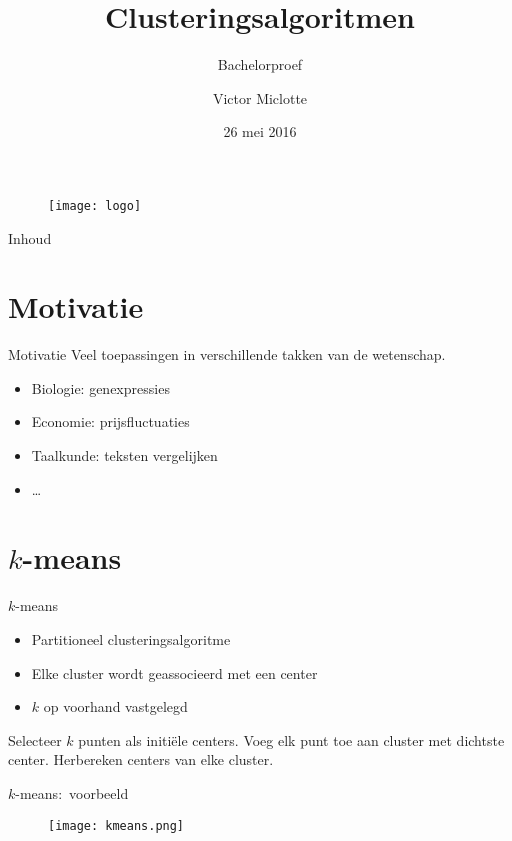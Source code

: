 \documentclass{beamer}
\title{Clusteringsalgoritmen}
\subtitle{Bachelorproef}
\author{Victor Miclotte}
\institute{Universiteit Gent}
\date{26 mei 2016}
\newcommand{\kmeans}{$k$-means}
\begin{document}
	\titlepage
	\begin{figure}
	\centering
	\texttt{[image: logo]} 
	\end{figure}

	
\begin{frame}{Inhoud}
	\tableofcontents
\end{frame}

\section{Motivatie}


\begin{frame}{Motivatie}
Veel toepassingen in verschillende takken van de wetenschap.
\begin{itemize}
 \item Biologie: genexpressies
 \item Economie: prijsfluctuaties
 \item Taalkunde: teksten vergelijken
 \item \ldots
\end{itemize}
\end{frame}


\section{\kmeans}


\begin{frame}{\kmeans}
\begin{itemize}
 \item Partitioneel clusteringsalgoritme
 \item Elke cluster wordt geassocieerd met een center
 \item $k$ op voorhand vastgelegd
\end{itemize}

\begin{algorithm}[H]
\begin{algorithmic}[1]
\STATE Selecteer $k$ punten als initiële centers.
\STATE Voeg elk punt toe aan cluster met dichtste center.
\STATE Herbereken centers van elke cluster.
\ENDWHILE
\end{algorithmic}
\caption{\kmeans}
\end{algorithm}
\end{frame}

\begin{frame}{\kmeans:\ voorbeeld}
 \begin{figure}[!ht]\centering
  \texttt{[image: kmeans.png]}
 \end{figure}
\end{frame}
\end{document}
